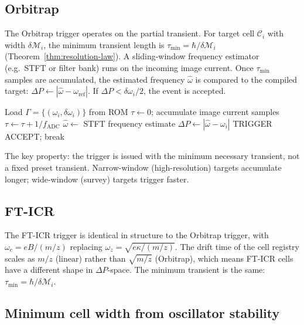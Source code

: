 \documentclass[twocolumn,10pt,a4paper]{article}
\theoremstyle{thmstyle}
\theoremstyle{definition}
\theoremstyle{remark}
\newcommand{\DP}{\Delta P}
\newcommand{\calC}{\mathcal{C}}
\newcommand{\Mop}{\mathcal{M}}
\begin{document}
\subsection{Orbitrap}

The Orbitrap trigger operates on the partial transient. For target
cell $\calC_i$ with width $\delta\Mop_i$, the minimum transient
length is $\tau_{\min} = \hbar/\delta\Mop_i$ (Theorem~\ref{thm:resolution-law}).
A sliding-window frequency estimator (e.g.\ STFT or filter bank) runs
on the incoming image current. Once $\tau_{\min}$ samples are
accumulated, the estimated frequency $\hat\omega$ is compared to the
compiled target: $\DP \gets |\hat\omega - \omega_{\mathrm{ref}}|$.
If $\DP < \delta\omega_i/2$, the event is accepted.

\begin{algorithm}[h]
\caption{Orbitrap partial-transient trigger}
\label{alg:orbitrap}
\begin{algorithmic}[1]
\State Load $\Gamma = \{(\omega_i, \delta\omega_i)\}$ from ROM
\State $\tau \gets 0$; accumulate image current samples
  \State $\tau \gets \tau + 1/f_{\mathrm{ADC}}$
  \If{$\tau \geq \tau_{\min}(\calC_i)$}
    \State $\hat\omega \gets$ STFT frequency estimate
    \State $\DP \gets |\hat\omega - \omega_i|$
    \If{$\DP \leq \delta\omega_i/2$} TRIGGER ACCEPT; break
    \EndIf
  \EndIf
\EndFor
\end{algorithmic}
\end{algorithm}

The key property: the trigger is issued with the minimum necessary
transient, not a fixed preset transient. Narrow-window (high-resolution)
targets accumulate longer; wide-window (survey) targets trigger faster.

\subsection{FT-ICR}

The FT-ICR trigger is identical in structure to the Orbitrap trigger,
with $\omega_c = eB/(m/z)$ replacing $\omega_z = \sqrt{e\kappa/(m/z)}$.
The drift time of the cell registry scales as $m/z$ (linear) rather
than $\sqrt{m/z}$ (Orbitrap), which means FT-ICR cells have a
different shape in $\DP$-space. The minimum transient is the same:
$\tau_{\min} = \hbar/\delta\Mop_i$.

\subsection{Minimum cell width from oscillator stability}
\end{document}

